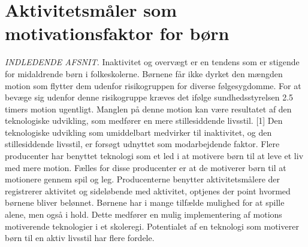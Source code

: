 \section{Aktivitetsmåler som motivationsfaktor for børn}

\textit{INDLEDENDE AFSNIT.} \label{tracker_intro}
Inaktivitet og overvægt er en tendens som er stigende for midaldrende børn i folkeskolerne. Børnene får ikke dyrket den mængden motion som flytter dem udenfor risikogruppen for diverse følgesygdomme. For at bevæge sig udenfor denne risikogruppe kræves det ifølge sundhedsstyrelsen 2.5 timers motion ugentligt. Manglen på denne motion kan være resultatet af den teknologiske udvikling, som medfører en mere stillesiddende livsstil. [1]  \newline 
Den teknologiske udvikling som umiddelbart medvirker til inaktivitet, og den stillesiddende livsstil, er forsøgt udnyttet som modarbejdende faktor. Flere producenter har benyttet teknologi som et led i at motivere børn til at leve et liv med mere motion. Fælles for disse producenter er at de motiverer børn til at motionere gennem spil og leg. Producenterne benytter aktivitetsmålere der registrerer aktivitet og sideløbende med aktivitet, optjenes der point hvormed børnene bliver belønnet. Børnene har i mange tilfælde mulighed for at spille alene, men også i hold. Dette medfører en mulig implementering af motions motiverende teknologier i et skoleregi. \newline
Potentialet af en teknologi som motiverer børn til en aktiv livsstil har flere fordele. 
